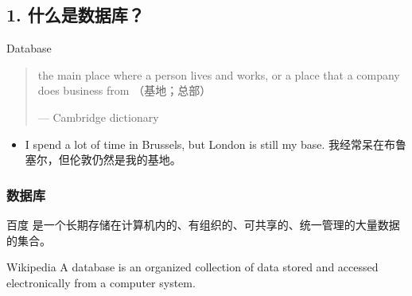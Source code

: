 \documentclass[aspectratio=169, 14pt]{beamer}
\begin{document}
{
\begin{frame}
	\section{\textcolor{darkmidnightblue}{1. 什么是数据库？}}

	Data\alert{base}

	\pause

	\begin{quote}
		the main place where a person lives and works, or a place that a company does business from （基地；总部）
		\begin{flushright}
			--- Cambridge dictionary
		\end{flushright}
	\end{quote}
	\begin{itemize}
		\item I spend a lot of time in Brussels, but London is still my base. 我经常呆在布鲁塞尔，但伦敦仍然是我的基地。
	\end{itemize}
\end{frame}

}


\begin{frame}
	\frametitle{数据库}
	\begin{block}{百度}
		是一个长期存储在计算机内的、有组织的、可共享的、统一管理的大量数据的集合。
	\end{block}
	\begin{block}{Wikipedia}
		A database is an organized collection of data stored and accessed electronically from a computer system.
	\end{block}
\end{frame}
\end{document}
